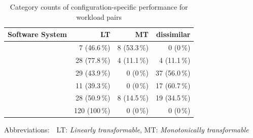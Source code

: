 \begin{table}
	\caption{Category counts of configuration-specific performance for workload pairs}
	\begin{tabular}{p{2.4cm}rrr}
		\toprule
		\textbf{Software System} & \textbf{LT} & \textbf{MT} & \textbf{dissimilar}\\
		\midrule
		\jumper &  7 (46.6\,\%) & \cellcolor{nicegreen!20}8 (53.3\,\%)& 0 (0\,\%)\\
		\kanzi &  \cellcolor{nicegreen!20}28 (77.8\,\%)& 4 (11.1\,\%) & 4 (11.1\,\%)\\
		\dconvert &  29 (43.9\,\%) & 0 (0\,\%) & \cellcolor{nicegreen!20}37 (56.0\,\%)\\
		\htwo &  11 (39.3\,\%) & 0 (0\,\%) & \cellcolor{nicegreen!20}17 (60.7\,\%)\\
		\batik &  \cellcolor{nicegreen!20}28 (50.9\,\%) & 8 (14.5\,\%) & 19 (34.5\,\%)\\
		\jadx  &  \cellcolor{nicegreen!20}120 (100\,\%) & 0 (0\,\%) & 0 (0\,\%)\\
		\bottomrule
	\end{tabular}
	\label{tab:categorization}
	
	{\vspace{2mm}
		{\footnotesize Abbreviations:$\quad$LT: \textit{Linearly transformable}, MT: \textit{Monotonically transformable}}
	\vspace{0.1cm}}
	
\end{table}

